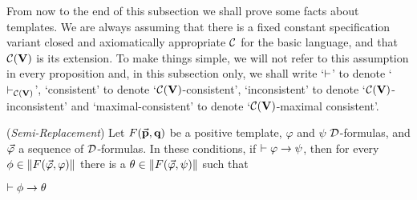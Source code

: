 \qquad From now to the end of this subsection we shall prove some facts about templates. We are always assuming that there is a fixed constant specification variant closed and axiomatically appropriate $\mathcal{C}$ for the basic language, and that $\mathcal{C}(\textbf{V})$ is its extension. To make things simple, we will not refer to this assumption in every proposition and, in this subsection only, we shall write `$\vdash$' to denote `$\vdash_{\mathcal{C}(\textbf{V})}$', `consistent' to denote `$\mathcal{C}(\textbf{V})$-consistent', `inconsistent' to denote `$\mathcal{C}(\textbf{V})$-inconsistent' and `maximal-consistent' to denote `$\mathcal{C}(\textbf{V})$-maximal consistent'.



\begin{pro}(\textit{Semi-Replacement})
	Let $F(\vec{\textbf{p}},\textbf{q})$ be a positive template,  $\varphi$ and $\psi$ $\mathcal{D}$-formulas, and $\vec{\varphi}$ a sequence of $\mathcal{D}$-formulas. In these conditions, if $\vdash \varphi \rightarrow \psi$, then for every $\phi \in \Arrowvert F(\vec{\varphi},\varphi) \Arrowvert$ there is a $\theta \in \Arrowvert F(\vec{\varphi},\psi) \Arrowvert$ such that
	
	
	\begin{center}
		$\vdash \phi \rightarrow \theta$
	\end{center}    
\end{pro}

